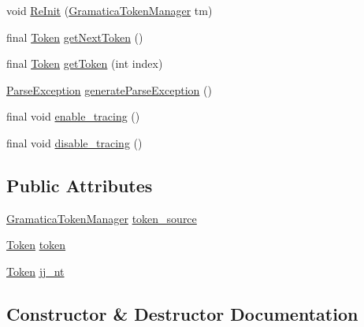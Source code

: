 \begin{DoxyCompactItemize}
\item 
void \mbox{\hyperlink{classanalizadores_1_1_gramatica_a92bab45b9e1fe815a3f87dc0d77ade38}{Re\+Init}} (\mbox{\hyperlink{classanalizadores_1_1_gramatica_token_manager}{Gramatica\+Token\+Manager}} tm)
\item 
final \mbox{\hyperlink{classanalizadores_1_1_token}{Token}} \mbox{\hyperlink{classanalizadores_1_1_gramatica_a9d110e08acaad0a9dafdb60f0bbab867}{get\+Next\+Token}} ()
\item 
final \mbox{\hyperlink{classanalizadores_1_1_token}{Token}} \mbox{\hyperlink{classanalizadores_1_1_gramatica_a58bb5ec9c1d432a2cc6194d6d829be8e}{get\+Token}} (int index)
\item 
\mbox{\hyperlink{classanalizadores_1_1_parse_exception}{Parse\+Exception}} \mbox{\hyperlink{classanalizadores_1_1_gramatica_a6052de1c7e91f9158b46025561ecd6cd}{generate\+Parse\+Exception}} ()
\item 
final void \mbox{\hyperlink{classanalizadores_1_1_gramatica_a6d0da3660603773438492f3be9406b48}{enable\+\_\+tracing}} ()
\item 
final void \mbox{\hyperlink{classanalizadores_1_1_gramatica_a5fafbda9430944314fe48e89f0d6a73a}{disable\+\_\+tracing}} ()
\end{DoxyCompactItemize}
\subsection*{Public Attributes}
\begin{DoxyCompactItemize}
\item 
\mbox{\hyperlink{classanalizadores_1_1_gramatica_token_manager}{Gramatica\+Token\+Manager}} \mbox{\hyperlink{classanalizadores_1_1_gramatica_a8f84a648c3c52e76b9dda324de4e8fb8}{token\+\_\+source}}
\item 
\mbox{\hyperlink{classanalizadores_1_1_token}{Token}} \mbox{\hyperlink{classanalizadores_1_1_gramatica_afceaf2a819c239c3f6ac455202a7bc58}{token}}
\item 
\mbox{\hyperlink{classanalizadores_1_1_token}{Token}} \mbox{\hyperlink{classanalizadores_1_1_gramatica_a0ed9c4bd78991e110d9cef4f8aeee5ee}{jj\+\_\+nt}}
\end{DoxyCompactItemize}


\subsection{Constructor \& Destructor Documentation}
\mbox{\label{classanalizadores_1_1_gramatica_a542f05b9164371cc73d1b9a7e70eb031}} 
